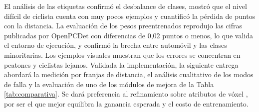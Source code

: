 \documentclass[11pt,letterpaper]{article}
\begin{document}
El análisis de las etiquetas confirmó el desbalance de clases, mostró que el nivel difícil de ciclista cuenta con muy pocos ejemplos y cuantificó la pérdida de puntos con la distancia. La evaluación de los pesos preentrenados reprodujo las cifras publicadas por OpenPCDet con diferencias de 0,02 puntos o menos, lo que valida el entorno de ejecución, y confirmó la brecha entre automóvil y las clases minoritarias. Los ejemplos visuales muestran que los errores se concentran en peatones y ciclistas lejanos. Validada la implementación, la siguiente entrega abordará la medición por franjas de distancia, el análisis cualitativo de los modos de falla y la evaluación de uno de los módulos de mejora de la Tabla \ref{tab:comparativa}. Se dará preferencia al refinamiento sobre atributos de vóxel \cite{deng2021}, por ser el que mejor equilibra la ganancia esperada y el costo de entrenamiento.
\end{document}
